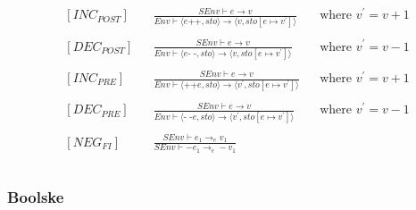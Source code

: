 \begin{align*}
&[INC_{POST}] & &\frac{SEnv \vdash e \rightarrow v}{Env \vdash \langle e\text{++}, sto \rangle \rightarrow \langle v, sto[e \mapsto v^\prime] \rangle} & &\text{where }v^\prime = v + 1\\\\
&[DEC_{POST}] & &\frac{SEnv \vdash e \rightarrow v}{Env \vdash \langle e\text{- -}, sto \rangle \rightarrow \langle v, sto[e \mapsto v^\prime] \rangle} & &\text{where }v^\prime = v - 1\\\\
&[INC_{PRE}] & &\frac{SEnv \vdash e \rightarrow v}{Env \vdash \langle \text{++}e, sto \rangle \rightarrow \langle v^\prime, sto[e \mapsto v^\prime] \rangle} & &\text{where }v^\prime = v + 1\\\\
&[DEC_{PRE}] & &\frac{SEnv \vdash e \rightarrow v}{Env \vdash \langle \text{- -}e, sto \rangle \rightarrow \langle v^\prime, sto[e \mapsto v^\prime] \rangle} & &\text{where }v^\prime = v - 1\\\\
&[NEG_{FI}] & &\frac{SEnv \vdash e_1 \rightarrow_e v_1}{SEnv \vdash -e_1 \rightarrow_e -v_1}  & &\\\\
\end{align*}

\subsubsection{Boolske}

